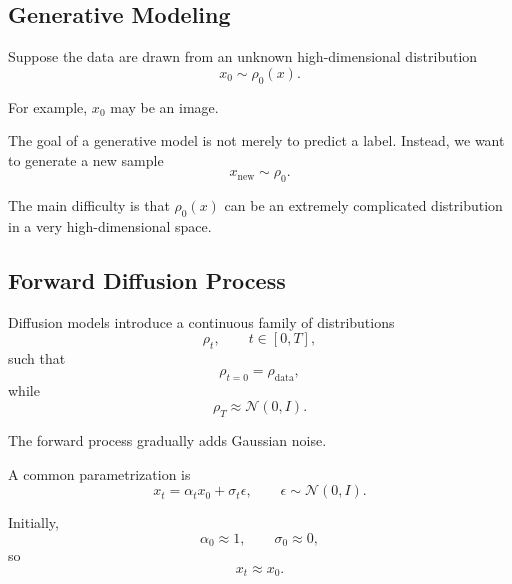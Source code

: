 \subsection{Generative Modeling}

Suppose the data are drawn from an unknown high-dimensional distribution
\begin{equation}
    x_0\sim \rho_0(x).
\end{equation}

For example, $x_0$ may be an image.

The goal of a generative model is not merely to predict a label. Instead, we
want to generate a new sample
\begin{equation}
    x_{\mathrm{new}}
    \sim
    \rho_0.
\end{equation}

The main difficulty is that $\rho_0(x)$ can be an extremely complicated
distribution in a very high-dimensional space.


\subsection{Forward Diffusion Process}

Diffusion models introduce a continuous family of distributions
\begin{equation}
    \rho_t,
    \qquad
    t\in[0,T],
\end{equation}
such that
\begin{equation}
    \rho_{t=0}
    =
    \rho_{\mathrm{data}},
\end{equation}
while
\begin{equation}
    \rho_T
    \approx
    \mathcal N(0,I).
\end{equation}

The forward process gradually adds Gaussian noise.

A common parametrization is
\begin{equation}
    \boxed{
    x_t
    =
    \alpha_t x_0
    +
    \sigma_t\epsilon,
    \qquad
    \epsilon\sim\mathcal N(0,I).
    }
\end{equation}

Initially,
\begin{equation}
    \alpha_0\approx1,
    \qquad
    \sigma_0\approx0,
\end{equation}
so
\begin{equation}
    x_t\approx x_0.
\end{equation}

